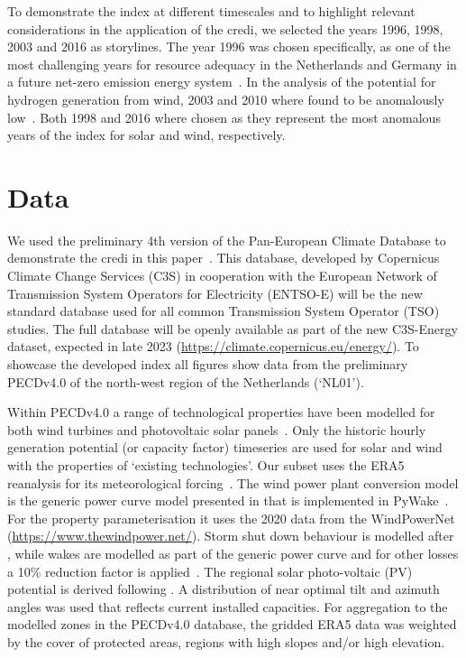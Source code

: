 \documentclass[12pt]{iopart}
\newcommand{\credi}[0]{{\sc credi}}
\begin{document}
To demonstrate the index at different timescales and to highlight relevant considerations in the application of the \credi, we selected the years 1996, 1998, 2003 and 2016 as storylines. 
The year 1996 was chosen specifically, as one of the most challenging years for resource adequacy in the Netherlands and Germany in a future net-zero emission energy system~\parencite[][p.56]{tennet2023}. 
In the analysis of the potential for hydrogen generation from wind, 2003 and 2010 where found to be anomalously low~\parencite[][p.58-61]{tennet2023}. 
Both 1998 and 2016 where chosen as they represent the most anomalous years of the index for solar and wind, respectively.






\section{Data}\label{secCP2:data}
We used the preliminary 4th version of the Pan-European Climate Database to demonstrate the \credi{} in this paper~\parencite[PECDv4.0;][]{Dubus2022PECD}. 
This database, developed by Copernicus Climate Change Services (C3S) in cooperation with the European Network of Transmission System Operators for Electricity (ENTSO-E) will be the new standard database used for all common Transmission System Operator (TSO) studies. 
The full database will be openly available as part of the new C3S-Energy dataset, expected in late 2023 (\url{https://climate.copernicus.eu/energy/}). 
To showcase the developed index all figures show data from the preliminary PECDv4.0 of the north-west region of the Netherlands (`NL01').

Within PECDv4.0 a range of technological properties have been modelled for both wind turbines and photovoltaic solar panels~\parencite{Dubus2022PECD}. 
Only the historic hourly generation potential (or capacity factor) timeseries are used for solar and wind with the properties of `existing technologies'.  
Our subset uses the ERA5 reanalysis for its meteorological forcing~\parencite{Hersbach2020}. 
The wind power plant conversion model is the generic power curve model presented in \textcite{Murcia2022} that is implemented in PyWake~\parencite{pywake}. 
For the property parameterisation it uses the 2020 data from the WindPowerNet (\url{https://www.thewindpower.net/}). 
Storm shut down behaviour is modelled after \textcite{MurciaLeon2021}, while wakes are modelled as part of the generic power curve and for other losses a 10\% reduction factor is applied~\parencite{Luzia2023}. 
The regional solar photo-voltaic (PV) potential is derived following \textcite{SaintDrenan2018}. 
A distribution of near optimal tilt and azimuth angles was used that reflects current installed capacities. 
For aggregation to the modelled zones in the PECDv4.0 database, the gridded ERA5 data was weighted by the cover of protected areas, regions with high slopes and/or high elevation.
\end{document}
